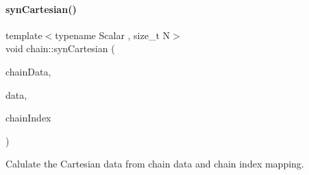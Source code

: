 \paragraph{\texorpdfstring{syn\+Cartesian()}{synCartesian()}}
{\footnotesize\ttfamily template$<$typename Scalar , size\+\_\+t N$>$ \\
void chain\+::syn\+Cartesian (\begin{DoxyParamCaption}\item[{\mbox{\hyperlink{namespacechain_aa715d2f046187ea9f0c3ea55605d6214}{Vector\+Array}}$<$ Scalar, N $>$ \&}]{chain\+Data,  }\item[{\mbox{\hyperlink{namespacechain_aa715d2f046187ea9f0c3ea55605d6214}{Vector\+Array}}$<$ Scalar, N $>$ \&}]{data,  }\item[{\mbox{\hyperlink{namespacechain_aa40d2da395c0ac2bc5f37832442ac403}{Index\+Array}}$<$ N $>$ \&}]{chain\+Index }\end{DoxyParamCaption})}



Calulate the Cartesian data from chain data and chain index mapping. 


